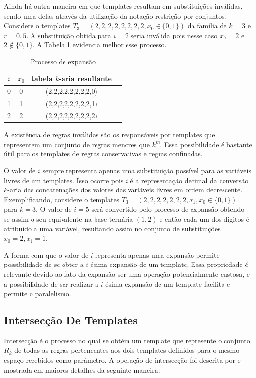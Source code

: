\documentclass[12pt,a4paper]{article}
\begin{document}
	Ainda há outra maneira em que templates resultam em substituições inválidas, sendo uma delas através da utilização da notação restrição por conjuntos. Considere o templates $T_3 = (2,2,2,2,2,2,2,2,x_0\in \{0,1\})$ da família de $k=3$ e $r=0,5$. A substituição obtida para $i = 2$ seria inválida pois nesse caso $x_0 = 2$ e $2 \notin \{0,1\}$. A Tabela \ref{tab:invalideExpansion2} evidencia melhor esse processo.

	\begin{table}[h!]
	\centering
	\caption{Processo de expansão}
	{
		\vspace{0.3cm}
		\begin{tabular}{cccc}
		\hline
		$i$ & $x_0$ & tabela $k$-aria resultante \\
		\hline
		0	&	0	&	(2,2,2,2,2,2,2,2,0)	\\
		1	&	1	&	(2,2,2,2,2,2,2,2,1)	\\
		2	&	2	&	(2,2,2,2,2,2,2,2,2)	\\
		\hline
		\end{tabular}
	}
	\label{tab:invalideExpansion2}
	\end{table}

	A existência de regras inválidas são os responsáveis por templates que representem um conjunto de regras menores que $k^m$. Essa possibilidade é bastante útil para os templates de regras conservativas e regras confinadas.

	O valor de $i$ sempre representa apenas uma substituição possível para as variáveis livres de um templates. Isso ocorre pois $i$ é a representação decimal da conversão $k$-aria das concatenações dos valores das variáveis livres em ordem decrescente. Exemplificando, considere o templates $T_3 = (2,2,2,2,2,2,2,x_1,x_0\in \{0,1\})$ para $k=3$. O valor de $i=5$ será convertido pelo processo de expansão obtendo-se assim o seu equivalente na base ternária $(1,2)$ e então cada um dos dígitos é atribuído a uma variável, resultando assim no conjunto de substituições ${x_0=2,x_1=1}$.

	A forma com que o valor de $i$ representa apenas uma expansão permite possibilidade de se obter a $i$-ésima expansão de um template. Essa propriedade é relevante devido ao fato da expansão ser uma operação potencialmente custosa, e a possibilidade de ser realizar a $i$-ésima expansão de um template facilita e permite o paralelismo.

\newpage\newpage
\subsection{Intersecção De Templates}%
	Intersecção é o processo no qual se obtêm um template que represente o conjunto $R_k$ de todas as regras pertencentes aos dois templates definidos para o mesmo espaço recebidos como parâmetro. A operação de intersecção foi descrita por  e mostrada em maiores detalhes da seguinte maneira:
\end{document}
